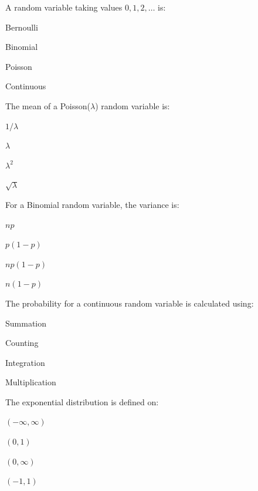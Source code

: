\documentclass{CWNUExam}
\begin{document}
\begin{question}
A random variable taking values $0,1,2,\ldots$ is:
\paren
\begin{choices}
\item Bernoulli
\item Binomial
\item Poisson
\item Continuous
\end{choices}
\end{question}

\begin{question}
The mean of a Poisson($\lambda$) random variable is:
\paren
\begin{choices}
\item $1/\lambda$
\item $\lambda$
\item $\lambda^2$
\item $\sqrt{\lambda}$
\end{choices}
\end{question}

\begin{question}
For a Binomial random variable, the variance is:
\paren
\begin{choices}
\item $np$
\item $p(1-p)$
\item $np(1-p)$
\item $n(1-p)$
\end{choices}
\end{question}

\begin{question}
The probability for a continuous random variable is calculated using:
\paren
\begin{choices}
\item Summation
\item Counting
\item Integration
\item Multiplication
\end{choices}
\end{question}

\begin{question}
The exponential distribution is defined on:
\paren
\begin{choices}
\item $(-\infty,\infty)$
\item $(0,1)$
\item $(0,\infty)$
\item $(-1,1)$
\end{choices}
\end{question}
\end{document}
